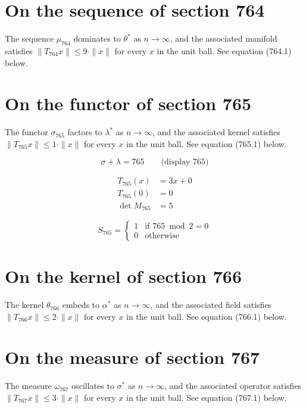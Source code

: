 \documentclass{article}
\begin{document}
\section{On the sequence of section 764}
The sequence $\mu_{764}$ dominates to $\theta^{*}$ as $n \to \infty$,
and the associated manifold satisfies $\|T_{764} x\| \leq 9 \cdot \|x\|$
for every $x$ in the unit ball. See equation (764.1) below.

\section{On the functor of section 765}
The functor $\sigma_{765}$ factors to $\lambda^{*}$ as $n \to \infty$,
and the associated kernel satisfies $\|T_{765} x\| \leq 1 \cdot \|x\|$
for every $x$ in the unit ball. See equation (765.1) below.

$$
\sigma + \lambda = 765 \qquad \text{(display 765)}
$$

\begin{align}
T_{765}(x) &= 3 x + 0 \\
T_{765}(0) &= 0 \\
\det M_{765} &= 5
\end{align}

\begin{equation}
S_{765} = \begin{cases} 1 & \text{if } 765 \bmod 2 = 0 \\ 0 & \text{otherwise} \end{cases}
\end{equation}

\section{On the kernel of section 766}
The kernel $\theta_{766}$ embeds to $\alpha^{*}$ as $n \to \infty$,
and the associated field satisfies $\|T_{766} x\| \leq 2 \cdot \|x\|$
for every $x$ in the unit ball. See equation (766.1) below.

\section{On the measure of section 767}
The measure $\omega_{767}$ oscillates to $\sigma^{*}$ as $n \to \infty$,
and the associated operator satisfies $\|T_{767} x\| \leq 3 \cdot \|x\|$
for every $x$ in the unit ball. See equation (767.1) below.
\end{document}
